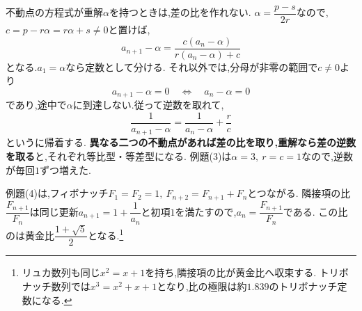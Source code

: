     不動点の方程式が重解$\alpha$を持つときは,差の比を作れない.
    $\alpha=\dfrac{p-s}{2r}$なので,$c=p-r\alpha=r\alpha+s\ne0$と置けば,
    \[
      a_{n+1}-\alpha
      =\frac{c(a_n-\alpha)}{r(a_n-\alpha)+c}
    \]
    となる.$a_1=\alpha$なら定数として分ける.
    それ以外では,分母が非零の範囲で$c\ne0$より
    \[
      a_{n+1}-\alpha=0
      \quad\Longleftrightarrow\quad a_n-\alpha=0
    \]
    であり,途中で$\alpha$に到達しない.従って逆数を取れて,
    \[
      \frac1{a_{n+1}-\alpha}
      =\frac1{a_n-\alpha}+\frac rc
    \]
    というに帰着する.
    \textbf{異なる二つの不動点があれば差の比を取り,重解なら差の逆数を取る}と,それぞれ等比型・等差型になる.
    例題(3)は$\alpha=3,\ r=c=1$なので,逆数が毎回$1$ずつ増えた.

    例題(4)は,フィボナッチ$F_1=F_2=1,\ F_{n+2}=F_{n+1}+F_n$とつながる.
    隣接項の比$\dfrac{F_{n+1}}{F_n}$は同じ更新$a_{n+1}=1+\dfrac{1}{a_n}$と初項$1$を満たすので,$a_n=\dfrac{F_{n+1}}{F_n}$である.
    この比のは黄金比$\dfrac{1+\sqrt5}{2}$となる.\footnote{リュカ数列も同じ$x^2=x+1$を持ち,隣接項の比が黄金比へ収束する.
    トリボナッチ数列では$x^3=x^2+x+1$となり,比の極限は約$1.839$のトリボナッチ定数になる.}

